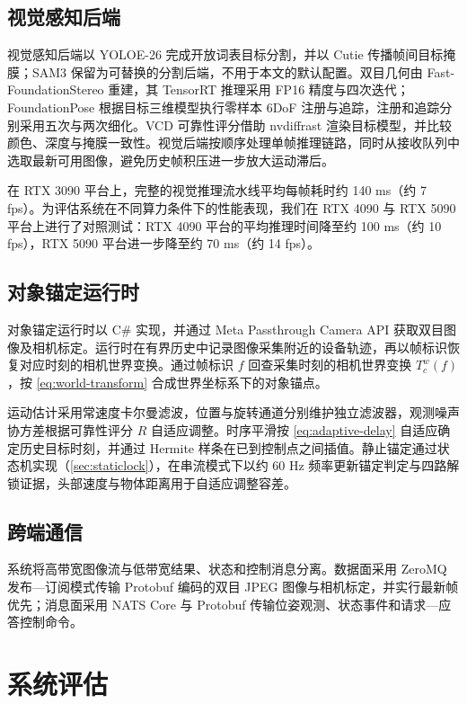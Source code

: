 \documentclass[review]{vgtc}
\begin{document}
\subsection{视觉感知后端}


视觉感知后端以 YOLOE-26 完成开放词表目标分割，并以 Cutie 传播帧间目标掩膜；SAM3 保留为可替换的分割后端，不用于本文的默认配置。双目几何由 Fast-FoundationStereo 重建，其 TensorRT 推理采用 FP16 精度与四次迭代；FoundationPose 根据目标三维模型执行零样本 6DoF 注册与追踪，注册和追踪分别采用五次与两次细化。VCD 可靠性评分借助 nvdiffrast 渲染目标模型，并比较颜色、深度与掩膜一致性。视觉后端按顺序处理单帧推理链路，同时从接收队列中选取最新可用图像，避免历史帧积压进一步放大运动滞后。

在 RTX 3090 平台上，完整的视觉推理流水线平均每帧耗时约 140 ms（约 7 fps）。为评估系统在不同算力条件下的性能表现，我们在 RTX 4090 与 RTX 5090 平台上进行了对照测试：RTX 4090 平台的平均推理时间降至约 100 ms（约 10 fps），RTX 5090 平台进一步降至约 70 ms（约 14 fps）。

\subsection{对象锚定运行时}


对象锚定运行时以 C\# 实现，并通过 Meta Passthrough Camera API 获取双目图像及相机标定。运行时在有界历史中记录图像采集附近的设备轨迹，再以帧标识恢复对应时刻的相机世界变换。通过帧标识 $f$ 回查采集时刻的相机世界变换 $T_c^w (f)$，按 \ref{eq:world-transform} 合成世界坐标系下的对象锚点。

运动估计采用常速度卡尔曼滤波，位置与旋转通道分别维护独立滤波器，观测噪声协方差根据可靠性评分 $R$ 自适应调整。时序平滑按 \ref{eq:adaptive-delay} 自适应确定历史目标时刻，并通过 Hermite 样条在已到控制点之间插值。静止锚定通过状态机实现（\ref{sec:staticlock}），在串流模式下以约 60 Hz 频率更新锚定判定与四路解锁证据，头部速度与物体距离用于自适应调整容差。

\subsection{跨端通信}


系统将高带宽图像流与低带宽结果、状态和控制消息分离。数据面采用 ZeroMQ 发布---订阅模式传输 Protobuf 编码的双目 JPEG 图像与相机标定，并实行最新帧优先；消息面采用 NATS Core 与 Protobuf 传输位姿观测、状态事件和请求---应答控制命令。

\section{系统评估}\label{sec:eval}
\end{document}
